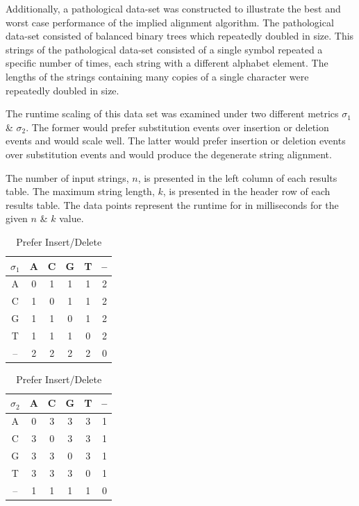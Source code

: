 \documentclass[11pt]{article}
\begin{document}
Additionally, a pathological data-set was constructed to illustrate the best and worst case performance of the implied alignment algorithm.
The pathological data-set consisted of balanced binary trees which repeatedly doubled in size.
This strings of the pathological data-set consisted of a single symbol repeated a specific number of times, each string with a different alphabet element.
The lengths of the strings containing many copies of a single character were repeatedly doubled in size.

The runtime scaling of this data set was examined under two different metrics $\sigma_1$ \& $\sigma_2$.
The former would prefer substitution events over insertion or deletion events and would scale well.
The latter would prefer insertion or deletion events over substitution events and would produce the degenerate string alignment.

The number of input strings, $n$, is presented in the left column of each results table.
The maximum string length, $k$, is presented in the header row of each results table.
The data points represent the runtime for in milliseconds for the given $n$ \& $k$ value.

\begin{table}[!hbt]
\caption{Metric costs of $\sigma_1$ \& $\sigma_2$}
\label{Tab:Metrics}
\begin{minipage}{0.5\textwidth}
\centering
\begin{tabular}{c|ccccc}
$\sigma_1$ & A & C & G & T & -- \\ \hline 
        A  & 0 & 1 & 1 & 1 & 2  \\
        C  & 1 & 0 & 1 & 1 & 2  \\
        G  & 1 & 1 & 0 & 1 & 2  \\
        T  & 1 & 1 & 1 & 0 & 2  \\
        -- & 2 & 2 & 2 & 2 & 0
\end{tabular}
\caption{Prefer Align}
\end{minipage}
\hfill
\begin{minipage}{0.5\textwidth}
\centering
\begin{tabular}{c|ccccc}
$\sigma_2$ & A & C & G & T & -- \\ \hline 
        A  & 0 & 3 & 3 & 3 & 1  \\
        C  & 3 & 0 & 3 & 3 & 1  \\
        G  & 3 & 3 & 0 & 3 & 1  \\
        T  & 3 & 3 & 3 & 0 & 1  \\
        -- & 1 & 1 & 1 & 1 & 0
\end{tabular}
\caption{Prefer Insert/Delete}
\end{minipage}
\end{table}
\end{document}
